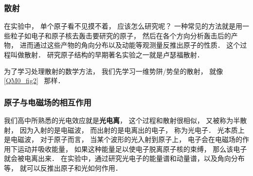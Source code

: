 \subsubsection{散射}
在实验中， 单个原子看不见摸不着， 应该怎么研究呢？ 一种常见的方法就是用一些粒子如电子和原子核去轰击要研究的原子， 然后在各个方向分析轰击后的产物， 进而通过这些产物的角向分布以及动能等观测量反推出原子的性质． 这个过程叫做散射． 研究原子结构的早期著名实验之一就是卢瑟福散射．

为了学习处理散射的数学方法， 我们先学习一维势阱/势垒的散射， 就像\autoref{QM0_fig2}~ 那样．

\subsubsection{原子与电磁场的相互作用}
我们高中所熟悉的光电效应就是\textbf{光电离}， 这个过程和散射很相似， 又被称为半散射， 因为入射的是电磁波， 而出射的是电离出的电子， 称为光电子． 光本质上是电磁波， 对于原子而言， 当某个波形的光入射到原子上， 电子会在电磁场的作用下运动并吸收能量， 如果这种能量足以使电子脱离原子核的束缚， 那么该电子就会被电离出来． 在实验中，通过研究光电子的能量谱和动量谱，以及角向分布等， 就可以反推出原子和光如何作用．
